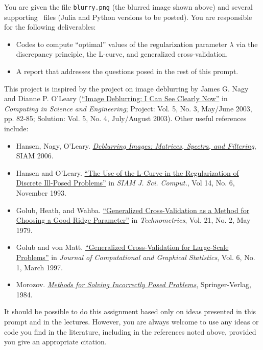 \documentclass[12pt, leqno]{article} %
\begin{document}
You are given the file {\tt blurry.png} (the blurred image shown above)
and several supporting \matlab\ files (Julia and Python versions to be posted).
You are responsible for the following deliverables:
\begin{itemize}
\item Codes to compute ``optimal'' values of the regularization
  parameter $\lambda$ via the discrepancy principle, the L-curve,
  and generalized cross-validation.
\item A report that addresses the questions posed in the rest of this
  prompt.
\end{itemize}
This project is inspired by the project on image deblurring by James
G. Nagy and Dianne P. O'Leary (\href{http://ieeexplore.ieee.org/document/1196312/}{``Image Deblurring: I Can See Clearly
Now''} in {\em Computing in Science and Engineering}; Project: Vol. 5,
No. 3, May/June 2003, pp. 82-85; Solution: Vol. 5, No. 4, July/August
2003).  Other useful references include:
\begin{itemize}
  \item Hansen, Nagy, O'Leary.  \href{http://epubs.siam.org/doi/book/10.1137/1.9780898718874}{\em Deblurring Images: Matrices, Spectra, and Filtering}, SIAM 2006.
  \item Hansen and O'Leary.  \href{http://epubs.siam.org/doi/abs/10.1137/0914086}{``The Use of the L-Curve in the Regularization of Discrete Ill-Posed Problems''} in {\em SIAM J. Sci. Comput.}, Vol 14, No. 6, November 1993.
  \item Golub, Heath, and Wahba.  \href{http://www.stat.wisc.edu/~wahba/ftp1/oldie/golub.heath.wahba.pdf}{``Generalized Cross-Validation as a Method for Choosing a Good Ridge Parameter''} in {\em Technometrics}, Vol. 21, No. 2, May 1979.
  \item Golub and von Matt. \href{https://www.jstor.org/stable/pdf/1390722.pdf}{``Generalized Cross-Validation for Large-Scale Problems''} in {\em Journal of Computational and Graphical Statistics}, Vol. 6, No. 1, March 1997.
  \item Morozov.  \href{https://link.springer.com/book/10.1007%2F978-1-4612-5280-1}{\em Methods for Solving Incorrectly Posed Problems},
  Springer-Verlag, 1984.
\end{itemize}
It should be possible to do this assignment based only on ideas
presented in this prompt and in the lectures.  However,
you are always welcome to use any ideas or code you find in the
literature, including in the references noted above, provided you
give an appropriate citation.
\end{document}
